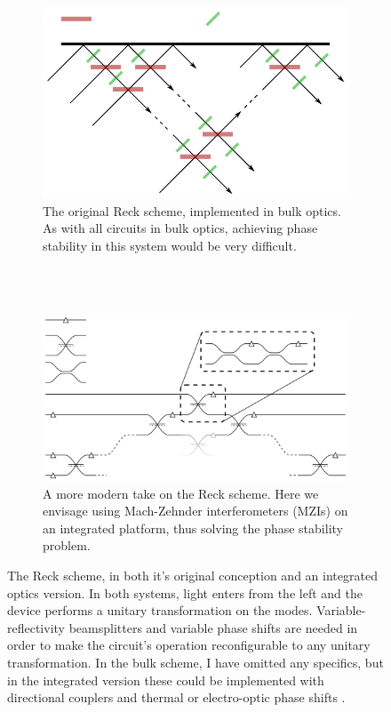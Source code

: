 \begin{figure}
  \begin{subfigure}{\textwidth}
    \centering
    \includegraphics{figures/reck_original}
    \caption{The original Reck scheme, implemented in bulk optics. As with all
    circuits in bulk optics, achieving phase stability in this system would be
    very difficult.}
    \label{fig:ReckOriginal}
  \end{subfigure} \\
  \vspace{1cm} \\
  \begin{subfigure}{\textwidth}
    \centering
    \includegraphics{figures/reck_general}
    \caption{A more modern take on the Reck scheme. Here we envisage using
    Mach-Zehnder interferometers (MZIs) on an integrated platform, thus solving
    the phase stability problem.}
    \label{fig:ReckGeneral}
  \end{subfigure}
  \caption[The Reck scheme, in both it's original conception and an integrated
  optics version]{The Reck scheme, in both it's original conception and an
  integrated
  optics version. In both systems, light enters from the left and the device
  performs a unitary transformation on the modes. Variable-reflectivity
  beamsplitters and variable phase shifts are needed in order to make the
  circuit's operation reconfigurable to any unitary transformation. In the
  bulk scheme, I have omitted any specifics, but in the integrated version these
  could be implemented with directional couplers and thermal or electro-optic
  phase shifts .}
  \label{fig:ReckScheme}
\end{figure}

